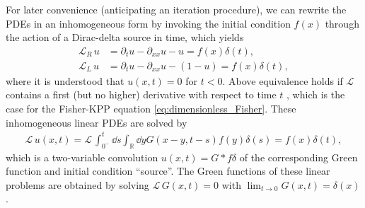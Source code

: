 \documentclass[amsmath,amssymb,amsfonts,aps,pre,preprint,superscriptaddress,showpacs,showkeys,longbibliography,nofootinbib]{revtex4-1}
\newcommand*{\lop}{\mathcal{L}\,}
\newcommand{\pa}{\partial}
\begin{document}
For later convenience (anticipating an iteration procedure), we can rewrite the PDEs in an inhomogeneous form by invoking the initial condition $f(x)$ through the action of a Dirac-delta source in time, which yields
\begin{align}
\label{eq:linear_operator_Right_Alt}
    \mathcal{L}_R \, u &= \partial_t u -\partial_{xx}u - u=f(x)\delta(t),\\
    \mathcal{L}_L \,  u &=\partial_t u -\partial_{xx}u - (1-u)=f(x)\delta(t),
    \label{eq:linear_operator_Left_Alt}
\end{align}
where it is understood that $u(x,t)=0$ for $t<0$. Above equivalence holds if $\mathcal{L}$ contains a first (but no higher) derivative with respect to time $t$ \cite{Berx_2021}, which is the case for the Fisher-KPP equation \eqref{eq:dimensionless_Fisher}. These inhomogeneous linear PDEs are solved by
\begin{align}
 \label{eq:rewriten_linear_operator_delta_u}
	\lop u(x, t)=\lop \int_{0^{-}}^{t} \dd{s} \int_{\mathbb{R}} \dd{y} G\left(x-y, t-s\right) f\left(y\right) \delta\left(s\right)=f(x) \delta(t),
\end{align}
which is a two-variable convolution $u(x, t) = G \ast f \delta$ of the corresponding Green function and initial condition ``source''. The Green functions of these linear problems are obtained by solving  $\lop G(x,t)=0$ with $\lim_{t\to 0}G(x,t)=\delta(x)$. 

\end{document}

